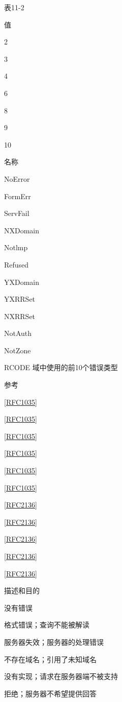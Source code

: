 表11-2

值

2

3

4

6

8

9

10

名称

NoError

FormErr

ServFail

NXDomain

Notlmp

Refused

YXDomain

YXRRSet

NXRRSet

NotAuth

NotZone

RCODE 域中使用的前10个错误类型

参考

\href{https://www.rfc-editor.org/rfc/rfc1035}{[RFC1035]}

\href{https://www.rfc-editor.org/rfc/rfc1035}{[RFC1035]}

\href{https://www.rfc-editor.org/rfc/rfc1035}{[RFC1035]}

\href{https://www.rfc-editor.org/rfc/rfc1035}{[RFC1035]}

\href{https://www.rfc-editor.org/rfc/rfc1035}{[RFC1035]}

\href{https://www.rfc-editor.org/rfc/rfc1035}{[RFC1035]}

\href{https://www.rfc-editor.org/rfc/rfc2136}{[RFC2136]}

\href{https://www.rfc-editor.org/rfc/rfc2136}{[RFC2136]}

\href{https://www.rfc-editor.org/rfc/rfc2136}{[RFC2136]}

\href{https://www.rfc-editor.org/rfc/rfc2136}{[RFC2136]}

\href{https://www.rfc-editor.org/rfc/rfc2136}{[RFC2136]}

描述和目的

没有错误

格式错误；查询不能被解读

服务器失效；服务器的处理错误

不存在域名；引用了未知域名

没有实现；请求在服务器端不被支持

拒绝；服务器不希望提供回答

